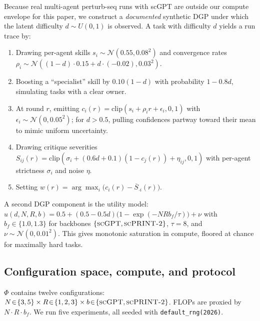 \documentclass[10pt,a4paper]{article}
\begin{document}
Because real multi-agent perturb-seq runs with scGPT are outside our compute
envelope for this paper, we construct a \emph{documented} synthetic DGP under
which the latent difficulty $d\!\sim\!U(0,1)$ is observed. A task with
difficulty $d$ yields a run trace by:
\begin{enumerate}[leftmargin=*,topsep=2pt,itemsep=0pt]
  \item Drawing per-agent skills $s_i \sim \mathcal{N}(0.55, 0.08^2)$ and
        convergence rates $\rho_i \sim \mathcal{N}((1{-}d)\cdot 0.15 + d\cdot(-0.02), 0.03^2)$.
  \item Boosting a ``specialist'' skill by $0.10(1{-}d)$ with probability
        $1 - 0.8 d$, simulating tasks with a clear owner.
  \item At round $r$, emitting $c_i(r) = \mathrm{clip}(s_i + \rho_i r + \epsilon_i, 0, 1)$
        with $\epsilon_i \sim \mathcal{N}(0, 0.05^2)$; for $d > 0.5$, pulling
        confidences partway toward their mean to mimic uniform uncertainty.
  \item Drawing critique severities
        $S_{ij}(r) = \mathrm{clip}(\sigma_i + (0.6d + 0.1)(1 - c_j(r)) + \eta_{ij}, 0, 1)$
        with per-agent strictness $\sigma_i$ and noise $\eta$.
  \item Setting $w(r) = \arg\max_i \bigl(c_i(r) - \overline{S}_{\cdot i}(r)\bigr)$.
\end{enumerate}
A second DGP component is the utility model:
$u(d, N, R, b) = 0.5 + (0.5 - 0.5 d)\bigl(1 - \exp(-N R b_f/\tau)\bigr) + \nu$
with $b_f \in\{1.0, 1.3\}$ for backbones $\{\textsc{scGPT}, \textsc{scPRINT-2}\}$,
$\tau\!=\!8$, and $\nu \sim \mathcal{N}(0, 0.01^2)$. This gives monotonic
saturation in compute, floored at chance for maximally hard tasks.

\subsection{Configuration space, compute, and protocol}

$\Phi$ contains twelve configurations:
$N\!\in\!\{3,5\}\times R\!\in\!\{1,2,3\}\times b\!\in\!\{\textsc{scGPT},
\textsc{scPRINT-2}\}$. FLOPs are proxied by $N \cdot R \cdot b_f$. We run five
experiments, all seeded with \texttt{default\_rng(2026)}.
\end{document}
